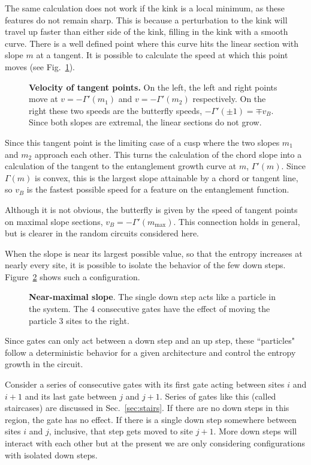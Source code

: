 The same calculation does not work if the kink is a local minimum, as these features do not remain sharp. This is because a perturbation to the kink will travel up faster than either side of the kink, filling in the kink with a smooth curve. There is a well defined point where this curve hits the linear section with slope $m$ at a tangent. It is possible to calculate the speed at which this point moves (see Fig.~\ref{fig:buttvel}).
\begin{figure}
	\centering
	
	\caption{\textbf{Velocity of tangent points.} On the left, the left and right points move at $v=-\Gamma'(m_1)$ and $v=-\Gamma'(m_2)$ respectively. On the right these two speeds are the butterfly speeds, $-\Gamma'(\pm1) = \mp v_B$. Since both slopes are extremal, the linear sections do not grow.}
	\label{fig:buttvel}
\end{figure}
Since this tangent point is the limiting case of a cusp where the two slopes $m_1$ and $m_2$ approach each other. This turns the calculation of the chord slope into a calculation of the tangent to the entanglement growth curve at $m$, $\Gamma'(m)$. Since $\Gamma(m)$ is convex, this is the largest slope attainable by a chord or tangent line, so $v_B$ is the fastest possible speed for a feature on the entanglement function.

Although it is not obvious, the butterfly is given by the speed of tangent points on maximal slope sections, $v_B = -\Gamma'(m_{\text{max}})$. This connection holds in general, but is clearer in the random circuits considered here.

When the slope is near its largest possible value, so that the entropy increases at nearly every site, it is possible to isolate the behavior of the few down steps. Figure~\ref{fig:particle} shows such a configuration.
\begin{figure}
	\centering
	
	\caption{\textbf{Near-maximal slope}. The single down step acts like a particle in the system. The 4 consecutive gates have the effect of moving the particle 3 sites to the right.}
	\label{fig:particle}
\end{figure}
Since gates can only act between a down step and an up step, these ``particles" follow a deterministic behavior for a given architecture and control the entropy growth in the circuit. 

Consider a series of consecutive gates with its first gate acting between sites $i$ and $i+1$ and its last gate between $j$ and $j+1$. Series of gates like this (called staircases) are discussed in Sec.~\ref{sec:stairs}. If there are no down steps in this region, the gate has no effect. If there is a single down step somewhere between sites $i$ and $j$, inclusive, that step gets moved to site $j+1$. More down steps will interact with each other but at the present we are only considering configurations with isolated down steps. 

